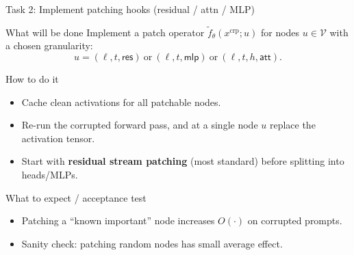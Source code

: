 \documentclass[aspectratio=169,xcolor={dvipsnames}]{beamer}
\renewcommand{\accent}[1]{\textbf{#1}}
\begin{document}
\begin{frame}[shrink=20]{Task 2: Implement patching hooks (residual / attn / MLP)}
\small
\begin{block}{What will be done}
Implement a patch operator $\tilde f_\theta(x^{\mathrm{crp}};u)$ for nodes
$u\in\mathcal{V}$ with a chosen granularity:
\[
u=(\ell,t,\textsf{res})\ \text{or}\ (\ell,t,\textsf{mlp})\ \text{or}\ (\ell,t,h,\textsf{att}).
\]
\end{block}

\begin{block}{How to do it}
\begin{itemize}\setlength\itemsep{3pt}
\item Cache clean activations for all patchable nodes.
\item Re-run the corrupted forward pass, and at a single node $u$ replace the activation tensor.
\item Start with \accent{residual stream patching} (most standard) before splitting into heads/MLPs.
\end{itemize}
\end{block}

\begin{block}{What to expect / acceptance test}
\begin{itemize}\setlength\itemsep{2pt}
\item Patching a “known important” node increases $O(\cdot)$ on corrupted prompts.
\item Sanity check: patching random nodes has small average effect.
\end{itemize}
\end{block}
\end{frame}
\end{document}

